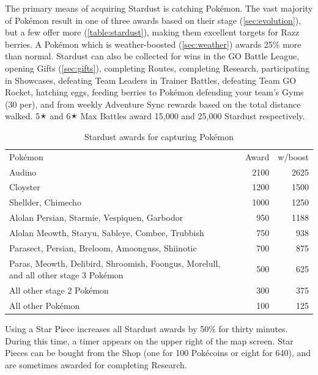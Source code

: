 The primary means of acquiring Stardust is catching Pokémon.
The vast majority of Pokémon result in one of three awards based on their stage
 (\autoref{sec:evolution}), but a few offer more (\autoref{table:stardust}),
 making them excellent targets for Razz berries.
A Pokémon which is weather-boosted (\autoref{sec:weather}) awards 25\% more than normal.
Stardust can also be collected for wins in the GO Battle League,
  opening Gifts (\autoref{sec:gifts}),
  completing Routes,
  completing Research,
  participating in Showcases,
  defeating Team Leaders in Trainer Battles,
  defeating Team GO Rocket,
  hatching eggs,
  feeding berries to Pokémon defending your team's Gyms (30 per),
  and from weekly Adventure Sync rewards based on the total distance walked.
5🟉 and 6🟉 Max Battles award 15,000 and 25,000 Stardust respectively.
\begin{table}[ht]
\centering
\begin{tabular}{p{}rr}
Pokémon & Award & w/boost\\
\Midrule
Audino & 2100 & 2625\\
Cloyster & 1200 & 1500\\
Shellder, Chimecho & 1000 & 1250\\
Alolan Persian, Starmie, Vespiquen, Garbodor & 950 & 1188\\
Alolan Meowth, Staryu, Sableye, Combee, Trubbish & 750 & 938\\
Parasect, Persian, Breloom, Amoonguss, Shiinotic & 700 & 875\\
Paras, Meowth, Delibird, Shroomish, Foongus,\newline
\hspace{\parindent}Morelull, and all other stage 3 Pokémon & 500 & 625\\
All other stage 2 Pokémon & 300 & 375\\
All other Pokémon & 100 & 125\\
\end{tabular}
\caption{Stardust awards for capturing Pokémon}
\label{table:stardust}
\end{table}
Using a Star Piece increases all Stardust awards by 50\% for thirty minutes.
During this time, a timer appears on the upper right of the map screen.
Star Pieces can be bought from the Shop (one for 100 Pokécoins or eight for 640),
  and are sometimes awarded for completing Research.


